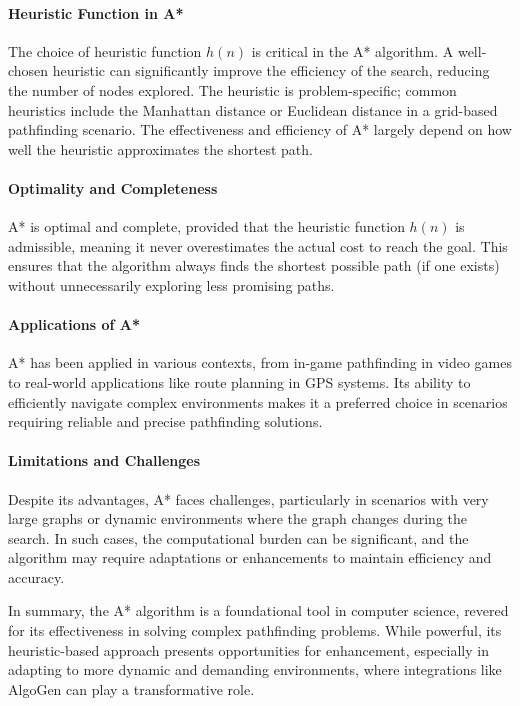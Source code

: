 \documentclass{article}
\begin{document}
\paragraph{Heuristic Function in A*}
The choice of heuristic function $h\left(n\right)$ is critical in the A* algorithm. A well-chosen heuristic can significantly improve the efficiency of the search, reducing the number of nodes explored. The heuristic is problem-specific; common heuristics include the Manhattan distance or Euclidean distance in a grid-based pathfinding scenario. The effectiveness and efficiency of A* largely depend on how well the heuristic approximates the shortest path.

\paragraph{Optimality and Completeness}
A* is optimal and complete, provided that the heuristic function $h\left(n\right)$ is admissible, meaning it never overestimates the actual cost to reach the goal. This ensures that the algorithm always finds the shortest possible path (if one exists) without unnecessarily exploring less promising paths.

\paragraph{Applications of A*}
A* has been applied in various contexts, from in-game pathfinding in video games to real-world applications like route planning in GPS systems. Its ability to efficiently navigate complex environments makes it a preferred choice in scenarios requiring reliable and precise pathfinding solutions.

\paragraph{Limitations and Challenges}
Despite its advantages, A* faces challenges, particularly in scenarios with very large graphs or dynamic environments where the graph changes during the search. In such cases, the computational burden can be significant, and the algorithm may require adaptations or enhancements to maintain efficiency and accuracy.

In summary, the A* algorithm is a foundational tool in computer science, revered for its effectiveness in solving complex pathfinding problems. While powerful, its heuristic-based approach presents opportunities for enhancement, especially in adapting to more dynamic and demanding environments, where integrations like AlgoGen can play a transformative role.
\end{document}
